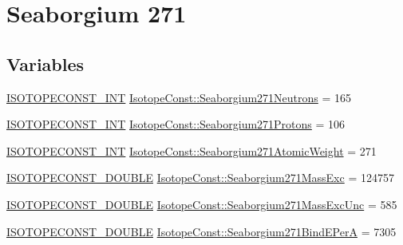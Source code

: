 \hypertarget{group___isotope_const-_seaborgium-_sg271}{}\section{Seaborgium 271}
\label{group___isotope_const-_seaborgium-_sg271}
\subsection*{Variables}
\begin{DoxyCompactItemize}
\item 
\mbox{\hyperlink{group___isotope_const-_macros_ga5f18360b3e99483a35c32d789e62621c}{I\+S\+O\+T\+O\+P\+E\+C\+O\+N\+S\+T\+\_\+\+I\+NT}} \mbox{\hyperlink{group___isotope_const-_seaborgium-_sg271_gaf5b1620f6ac99d0a13d4777b661a83bd}{Isotope\+Const\+::\+Seaborgium271\+Neutrons}} = 165
\item 
\mbox{\hyperlink{group___isotope_const-_macros_ga5f18360b3e99483a35c32d789e62621c}{I\+S\+O\+T\+O\+P\+E\+C\+O\+N\+S\+T\+\_\+\+I\+NT}} \mbox{\hyperlink{group___isotope_const-_seaborgium-_sg271_gab7953a42c9d14cec167334691e7638a5}{Isotope\+Const\+::\+Seaborgium271\+Protons}} = 106
\item 
\mbox{\hyperlink{group___isotope_const-_macros_ga5f18360b3e99483a35c32d789e62621c}{I\+S\+O\+T\+O\+P\+E\+C\+O\+N\+S\+T\+\_\+\+I\+NT}} \mbox{\hyperlink{group___isotope_const-_seaborgium-_sg271_ga1c012485124bcad5e96b378ca3a3ad13}{Isotope\+Const\+::\+Seaborgium271\+Atomic\+Weight}} = 271
\item 
\mbox{\hyperlink{group___isotope_const-_macros_ga8f45a7272ce02c0b4c65c44636ed719a}{I\+S\+O\+T\+O\+P\+E\+C\+O\+N\+S\+T\+\_\+\+D\+O\+U\+B\+LE}} \mbox{\hyperlink{group___isotope_const-_seaborgium-_sg271_ga649d837ff53d80b4ddcbadc32648545e}{Isotope\+Const\+::\+Seaborgium271\+Mass\+Exc}} = 124757
\item 
\mbox{\hyperlink{group___isotope_const-_macros_ga8f45a7272ce02c0b4c65c44636ed719a}{I\+S\+O\+T\+O\+P\+E\+C\+O\+N\+S\+T\+\_\+\+D\+O\+U\+B\+LE}} \mbox{\hyperlink{group___isotope_const-_seaborgium-_sg271_gad9a4467d45ef77e7c4aa2c60959d92bb}{Isotope\+Const\+::\+Seaborgium271\+Mass\+Exc\+Unc}} = 585
\item 
\mbox{\hyperlink{group___isotope_const-_macros_ga8f45a7272ce02c0b4c65c44636ed719a}{I\+S\+O\+T\+O\+P\+E\+C\+O\+N\+S\+T\+\_\+\+D\+O\+U\+B\+LE}} \mbox{\hyperlink{group___isotope_const-_seaborgium-_sg271_gacdbc766dea20c322d4c5f11681e4d5e7}{Isotope\+Const\+::\+Seaborgium271\+Bind\+E\+PerA}} = 7305
\item 

\end{DoxyCompactItemize}
